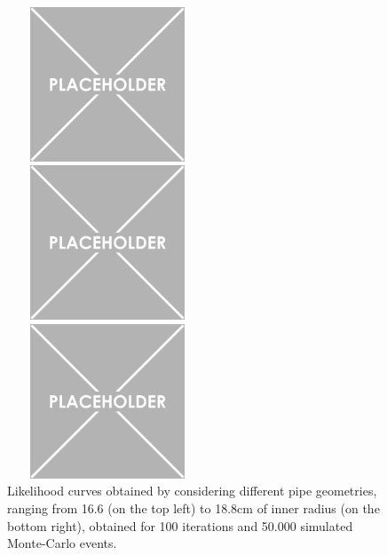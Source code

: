 \documentclass[a4paper, 11pt]{report}
\begin{document}
\begin{figure}[htbp]
\begin{minipage}[b]{.32\textwidth}
\includegraphics[width=6cm, height=4.6cm]{figs/placeholder.png}
\end{minipage}\hfill
\begin{minipage}[b]{.32\textwidth}
\includegraphics[width=6cm, height=4.6cm]{figs/placeholder.png}
\end{minipage} \hfill
\begin{minipage}[b]{.32\textwidth}
\includegraphics[width=6cm, height=4.6cm]{figs/placeholder.png}
\end{minipage} \hfill
\caption{Likelihood curves obtained by considering different pipe geometries, ranging from 16.6 (on the top left) to 18.8cm of inner radius (on the bottom right), obtained for 100 iterations and 50.000 simulated Monte-Carlo events.}
\label{fig:likelihoods2}
\end{figure}
\end{document}

